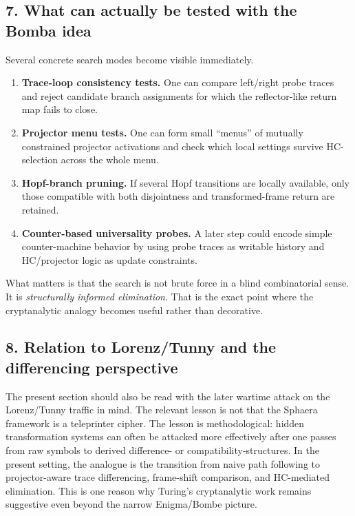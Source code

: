\subsection*{7. What can actually be tested with the Bomba idea}
Several concrete search modes become visible immediately.
\begin{enumerate}[leftmargin=2em,label=(\arabic*)]
  \item \textbf{Trace-loop consistency tests.} One can compare left/right probe traces and reject candidate branch assignments for which the reflector-like return map fails to close.
  \item \textbf{Projector menu tests.} One can form small ``menus'' of mutually constrained projector activations and check which local settings survive HC-selection across the whole menu.
  \item \textbf{Hopf-branch pruning.} If several Hopf transitions are locally available, only those compatible with both disjointness and transformed-frame return are retained.
  \item \textbf{Counter-based universality probes.} A later step could encode simple counter-machine behavior by using probe traces as writable history and HC/projector logic as update constraints.
\end{enumerate}
What matters is that the search is not brute force in a blind combinatorial sense. It is \emph{structurally informed elimination}. That is the exact point where the cryptanalytic analogy becomes useful rather than decorative.

\subsection*{8. Relation to Lorenz/Tunny and the differencing perspective}
The present section should also be read with the later wartime attack on the Lorenz/Tunny traffic in mind. The relevant lesson is not that the Sphaera framework is a teleprinter cipher. The lesson is methodological: hidden transformation systems can often be attacked more effectively after one passes from raw symbols to derived difference- or compatibility-structures. In the present setting, the analogue is the transition from naive path following to projector-aware trace differencing, frame-shift comparison, and HC-mediated elimination. This is one reason why Turing's cryptanalytic work remains suggestive even beyond the narrow Enigma/Bombe picture.

